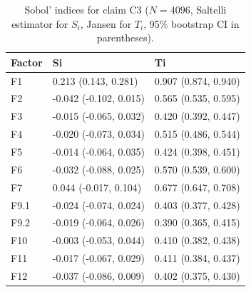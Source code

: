\begin{table}[ht]
\centering
\caption{Sobol' indices for claim C3 ($N=4096$, Saltelli estimator for $S_i$, Jansen for $T_i$, 95\% bootstrap CI in parentheses).} 
\label{tab:sobol_C3}
\begin{tabular}{lll}
  \hline
Factor & Si & Ti \\ 
  \hline
F1 & 0.213 (0.143, 0.281) & 0.907 (0.874, 0.940) \\ 
  F2 & -0.042 (-0.102, 0.015) & 0.565 (0.535, 0.595) \\ 
  F3 & -0.015 (-0.065, 0.032) & 0.420 (0.392, 0.447) \\ 
  F4 & -0.020 (-0.073, 0.034) & 0.515 (0.486, 0.544) \\ 
  F5 & -0.014 (-0.064, 0.035) & 0.424 (0.398, 0.451) \\ 
  F6 & -0.032 (-0.088, 0.025) & 0.570 (0.539, 0.600) \\ 
  F7 & 0.044 (-0.017, 0.104) & 0.677 (0.647, 0.708) \\ 
  F9.1 & -0.024 (-0.074, 0.024) & 0.403 (0.377, 0.428) \\ 
  F9.2 & -0.019 (-0.064, 0.026) & 0.390 (0.365, 0.415) \\ 
  F10 & -0.003 (-0.053, 0.044) & 0.410 (0.382, 0.438) \\ 
  F11 & -0.017 (-0.067, 0.029) & 0.411 (0.384, 0.437) \\ 
  F12 & -0.037 (-0.086, 0.009) & 0.402 (0.375, 0.430) \\ 
   \hline
\end{tabular}
\end{table}
